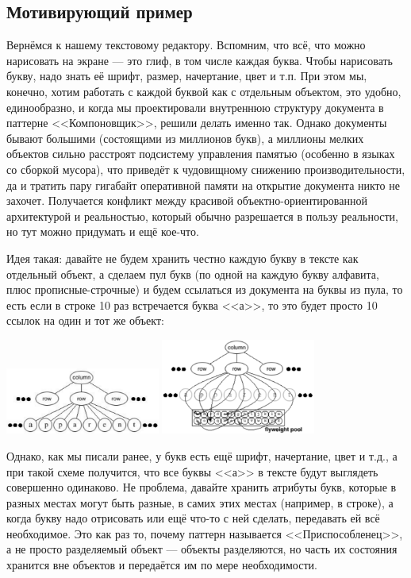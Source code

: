 \documentclass{../mcstext}
\begin{document}
\subsection{Мотивирующий пример}

Вернёмся к нашему текстовому редактору. Вспомним, что всё, что можно нарисовать на экране --- это глиф, в том числе каждая буква. Чтобы нарисовать букву, надо знать её шрифт, размер, начертание, цвет и т.п. При этом мы, конечно, хотим работать с каждой буквой как с отдельным объектом, это удобно, единообразно, и когда мы проектировали внутреннюю структуру документа в паттерне <<Компоновщик>>, решили делать именно так. Однако документы бывают большими (состоящими из миллионов букв), а миллионы мелких объектов сильно расстроят подсистему управления памятью (особенно в языках со сборкой мусора), что приведёт к чудовищному снижению производительности, да и тратить пару гигабайт оперативной памяти на открытие документа никто не захочет. Получается конфликт между красивой объектно-ориентированной архитектурой и реальностью, который обычно разрешается в пользу реальности, но тут можно придумать и ещё кое-что.

Идея такая: давайте не будем хранить честно каждую букву в тексте как отдельный объект, а сделаем пул букв (по одной на каждую букву алфавита, плюс прописные-строчные) и будем ссылаться из документа на буквы из пула, то есть если в строке 10 раз встречается буква <<а>>, то это будет просто 10 ссылок на один и тот же объект:

\begin{center}
    \includegraphics[width=0.38\textwidth]{noFlyweight.png}
    \raisebox{0.1\textheight}{\quad\Huge{$\rightarrow$}\quad}
    \includegraphics[width=0.38\textwidth]{flyweightExample.png}
\end{center}

Однако, как мы писали ранее, у букв есть ещё шрифт, начертание, цвет и т.д., а при такой схеме получится, что все буквы <<а>> в тексте будут выглядеть совершенно одинаково. Не проблема, давайте хранить атрибуты букв, которые в разных местах могут быть разные, в самих этих местах (например, в строке), а когда букву надо отрисовать или ещё что-то с ней сделать, передавать ей всё необходимое. Это как раз то, почему паттерн называется <<Приспособленец>>, а не просто разделяемый объект --- объекты разделяются, но часть их состояния хранится вне объектов и передаётся им по мере необходимости.
\end{document}
